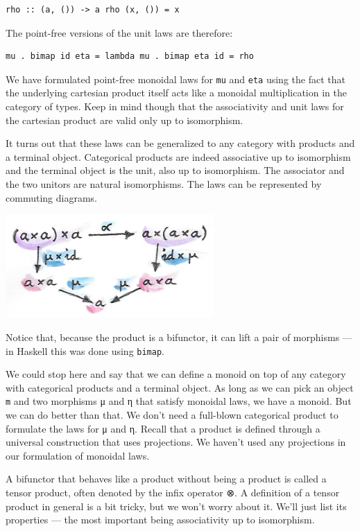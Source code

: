 \begin{verbatim}
rho :: (a, ()) -> a rho (x, ()) = x
\end{verbatim}

The point-free versions of the unit laws are therefore:

\begin{verbatim}
mu . bimap id eta = lambda mu . bimap eta id = rho
\end{verbatim}

We have formulated point-free monoidal laws for \texttt{mu} and
\texttt{eta} using the fact that the underlying cartesian product itself
acts like a monoidal multiplication in the category of types. Keep in
mind though that the associativity and unit laws for the cartesian
product are valid only up to isomorphism.

It turns out that these laws can be generalized to any category with
products and a terminal object. Categorical products are indeed
associative up to isomorphism and the terminal object is the unit, also
up to isomorphism. The associator and the two unitors are natural
isomorphisms. The laws can be represented by commuting diagrams.

\includegraphics[width=3.12500in]{images/assocmon.png}

Notice that, because the product is a bifunctor, it can lift a pair of
morphisms --- in Haskell this was done using \texttt{bimap}.

We could stop here and say that we can define a monoid on top of any
category with categorical products and a terminal object. As long as we
can pick an object \texttt{m} and two morphisms μ and η that satisfy
monoidal laws, we have a monoid. But we can do better than that. We
don't need a full-blown categorical product to formulate the laws for μ
and η. Recall that a product is defined through a universal construction
that uses projections. We haven't used any projections in our
formulation of monoidal laws.

A bifunctor that behaves like a product without being a product is
called a tensor product, often denoted by the infix operator ⊗. A
definition of a tensor product in general is a bit tricky, but we won't
worry about it. We'll just list its properties --- the most important
being associativity up to isomorphism.

